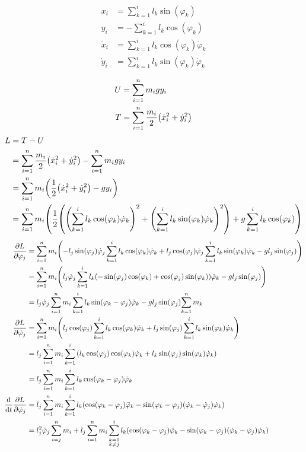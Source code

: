 \documentclass{article}
\renewcommand{\phi}{\varphi}
\begin{document}
\begin{align*}
  x_i &= \sum_{k=1}^i l_k \sin(\phi_k) \\
  y_i &= - \sum_{k=1}^i l_k \cos(\phi_k) \\
  \dot x_i &= \sum_{k=1}^i l_k \cos(\phi_k) \dot\phi_k \\
  \dot y_i &= \sum_{k=1}^i l_k \sin(\phi_k) \dot\phi_k \\
\end{align*}
\begin{align*}
  U &= \sum_{i=1}^n m_i g y_i \\
  T &= \sum_{i=1}^n \frac{m_i}{2} \pqty{\dot x_i^2 + \dot y_i^2} \\
\end{align*}
\begin{align*}
  L &= T - U \\
    &= \sum_{i=1}^n \frac{m_i}{2} \pqty{\dot x_i^2 + \dot y_i^2} - \sum_{i=1}^n m_i g y_i \\
    &= \sum_{i=1}^n m_i \pqty{\frac{1}{2} \pqty{\dot x_i^2 + \dot y_i^2} - g y_i} \\
    &= \sum_{i=1}^n m_i \pqty{\frac{1}{2} \pqty{{\pqty{\sum_{k=1}^i l_k \cos(\phi_k) \dot\phi_k}}^2 + {\pqty{\sum_{k=1}^i l_k \sin(\phi_k) \dot\phi_k}}^2} + g \sum_{k=1}^i l_k \cos(\phi_k)} \\
\end{align*}
\begin{align*}
  \pdv{L}{\phi_j} &= \sum_{i=1}^n m_i \pqty{-l_j \sin(\phi_j) \dot\phi_j \sum_{k=1}^i l_k \cos(\phi_k) \dot\phi_k + l_j \cos(\phi_j) \dot\phi_j \sum_{k=1}^i l_k \sin(\phi_k) \dot\phi_k - g l_j \sin(\phi_j)} \\
                  &= \sum_{i=1}^n m_i \pqty{l_j \dot\phi_j \sum_{k=1}^i l_k \pqty{-\sin(\phi_j) \cos(\phi_k) + \cos(\phi_j) \sin(\phi_k)} \dot\phi_k - g l_j \sin(\phi_j)} \\
                  &= l_j \dot\phi_j \sum_{i=1}^n m_i \sum_{k=1}^i l_k \sin(\phi_k - \phi_j) \dot\phi_k -  g l_j \sin(\phi_j) {\sum_{k=1}^n m_k}\\
  \pdv{L}{\dot\phi_j} &= \sum_{i=1}^n m_i \pqty{l_j \cos(\phi_j) \sum_{k=1}^i l_k \cos(\phi_k) \dot\phi_k + l_j \sin(\phi_j) \sum_{k=1}^i l_k \sin(\phi_k) \dot\phi_k} \\
                      &= l_j \sum_{i=1}^n m_i \sum_{k=1}^i \pqty{l_k \cos(\phi_j) \cos(\phi_k) \dot\phi_k + l_k \sin(\phi_j) \sin(\phi_k) \dot\phi_k} \\
                      &= l_j \sum_{i=1}^n m_i \sum_{k=1}^i l_k \cos(\phi_k - \phi_j) \dot\phi_k \\
  \dv{t} \pdv{L}{\dot\phi_j} &= l_j \sum_{i=1}^n m_i \sum_{k=1}^i l_k \pqty{\cos(\phi_k - \phi_j) \ddot\phi_k - \sin(\phi_k - \phi_j)(\dot\phi_k - \dot\phi_j)\dot\phi_k} \\
                             &= l_j^2 \ddot\phi_j \sum_{i=j}^n m_i + l_j \sum_{i=1}^n m_i \sum_{\substack{k=1\\k \neq j}}^i l_k \pqty{\cos(\phi_k - \phi_j) \ddot\phi_k - \sin(\phi_k - \phi_j)(\dot\phi_k - \dot\phi_j)\dot\phi_k} \\
\end{align*}
\end{document}
